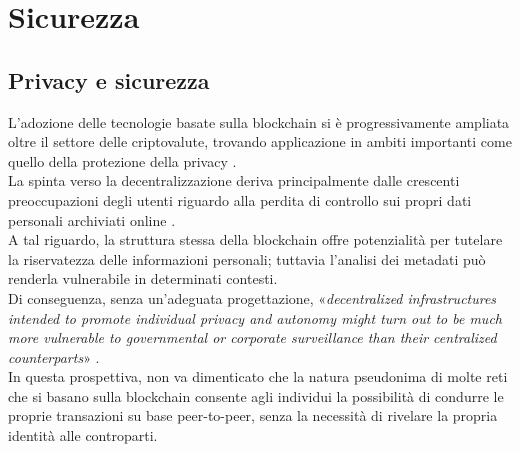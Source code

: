 \chapter{Sicurezza}
\section{Privacy e sicurezza}
L'adozione delle tecnologie basate sulla blockchain  si è progressivamente ampliata oltre il settore delle criptovalute, trovando applicazione in ambiti importanti come quello della protezione della privacy \cite{borroni_blockchain_2019}.
\\La spinta verso la decentralizzazione deriva principalmente dalle crescenti preoccupazioni degli utenti riguardo alla perdita di controllo sui propri dati personali archiviati online \cite{rodota_quattro_paradigmi_2018} \cite{alpa_identita_digitale_2017}.
\\A tal riguardo, la struttura stessa della blockchain offre potenzialità per tutelare la riservatezza delle informazioni personali; tuttavia l'analisi dei metadati può renderla vulnerabile in determinati contesti. 
\\Di conseguenza, senza un'adeguata progettazione,
«\textit{decentralized infrastructures intended to promote individual privacy and autonomy might turn out to be much more vulnerable to governmental or corporate surveillance than their centralized counterparts}» \cite{de_filippi_interplay_2016}.
\\In questa prospettiva, non va dimenticato che la natura pseudonima di molte
reti che si basano sulla blockchain consente agli individui la possibilità di
condurre le proprie transazioni su base peer-to-peer, senza la necessità di
rivelare la propria identità alle controparti.

